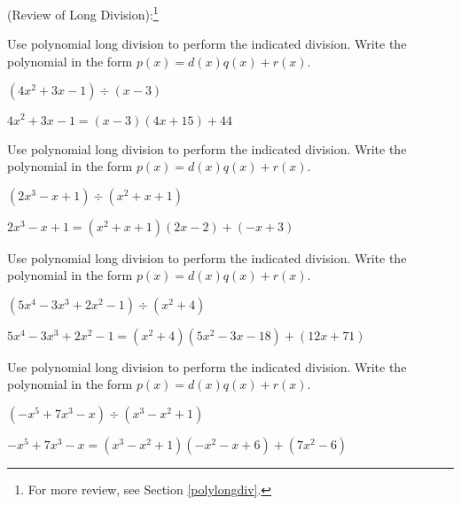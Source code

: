 \documentclass{ximera}
\begin{document}
	\author{Stitz-Zeager}



(Review of Long Division):\footnote{For more review, see Section \ref{polylongdiv}.}  

\begin{problem}\label{longpolydivreviewfirst}
Use polynomial long division to perform the indicated division.  Write the polynomial in the form $p(x) = d(x)q(x) + r(x)$.

$\left(4x^2+3x-1 \right) \div (x-3)$ 

\begin{solution}
$4x^2+3x-1 = (x-3)(4x+15) + 44$
\end{solution}

\end{problem}

\begin{problem}
Use polynomial long division to perform the indicated division.  Write the polynomial in the form $p(x) = d(x)q(x) + r(x)$.

$\left(2x^3-x+1 \right) \div \left(x^{2} +x+1 \right)$ 

\begin{solution}
$2x^3-x+1 = \left(x^2+x+1\right)(2x-2)+(-x+3)$
\end{solution}

\end{problem}

\begin{problem}
Use polynomial long division to perform the indicated division.  Write the polynomial in the form $p(x) = d(x)q(x) + r(x)$.

$\left(5x^{4} - 3x^{3} + 2x^{2} - 1 \right) \div \left(x^{2} + 4 \right)$ 

\begin{solution}
$5x^{4} - 3x^{3} + 2x^{2} - 1 = \left(x^{2} + 4 \right) \left(5x^{2} - 3x - 18 \right) + (12x + 71)$
\end{solution}

\end{problem}

\begin{problem}
Use polynomial long division to perform the indicated division.  Write the polynomial in the form $p(x) = d(x)q(x) + r(x)$.

$\left(-x^{5} + 7x^{3} - x \right) \div \left(x^{3} - x^{2} + 1 \right)$ 

\begin{solution}
$-x^{5} + 7x^{3} - x = \left(x^{3} - x^{2} + 1 \right) \left(-x^{2} - x + 6 \right) + \left(7x^{2} - 6 \right)$
\end{solution}

\end{problem} 
\end{document}
